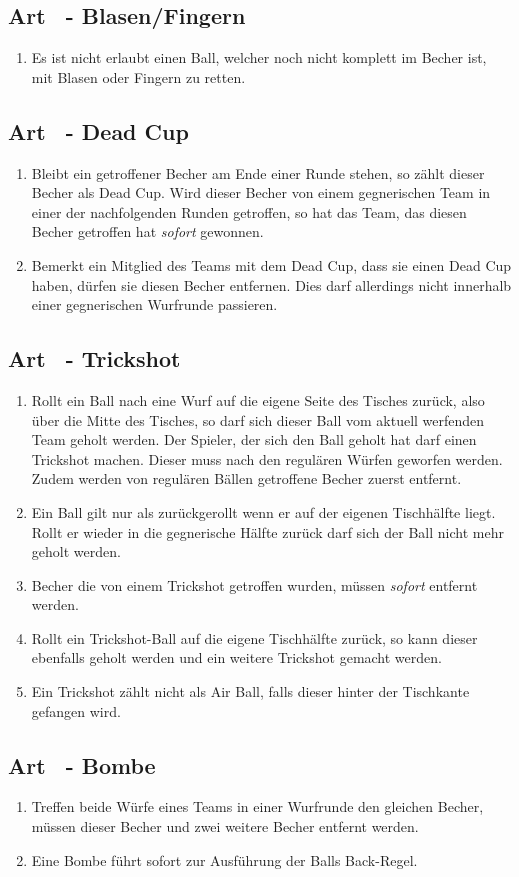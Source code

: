 \documentclass[a4paper,11pt]{scrartcl}
\newcommand{\enum}[1]{\begin{enumerate}[label=(\arabic*)]#1\end{enumerate}}
\newcommand{\art}[2]{\subsection*{#1} \enum{#2}}
\newcommand{\quot}[1]{\glqq #1\grqq}
\newcounter{art}
\begin{document}
\art{Art \theart\ - \quot{Blasen/Fingern}}{
    \item
        Es ist nicht erlaubt einen Ball, welcher noch nicht komplett im Becher ist, mit \quot{Blasen} oder \quot{Fingern} zu retten.
}

\art{Art \theart\ - \quot{Dead Cup}}{
    \item
        Bleibt ein getroffener Becher am Ende einer Runde stehen, so zählt dieser Becher als \quot{Dead Cup}. Wird dieser Becher von einem gegnerischen Team in einer der nachfolgenden Runden getroffen, so hat das Team, das diesen Becher getroffen hat \emph{sofort} gewonnen.
    \item
        Bemerkt ein Mitglied des Teams mit dem \quot{Dead Cup}, dass sie einen \quot{Dead Cup} haben, dürfen sie diesen Becher entfernen. Dies darf allerdings nicht innerhalb einer gegnerischen Wurfrunde passieren.
}

\art{Art \theart\ - \quot{Trickshot}}{
    \item
        Rollt ein Ball nach eine Wurf auf die eigene Seite des Tisches zurück, also über die Mitte des Tisches, so darf sich dieser Ball vom aktuell werfenden Team geholt werden. Der Spieler, der sich den Ball geholt hat darf einen \quot{Trickshot} machen. Dieser muss nach den regulären Würfen geworfen werden. Zudem werden von regulären Bällen getroffene Becher zuerst entfernt.
    \item
        Ein Ball gilt nur als zurückgerollt wenn er auf der eigenen Tischhälfte liegt. Rollt er wieder in die gegnerische Hälfte zurück darf sich der Ball nicht mehr geholt werden.
    \item
        Becher die von einem \quot{Trickshot} getroffen wurden, müssen \emph{sofort} entfernt werden.
    \item
        Rollt ein \quot{Trickshot}-Ball auf die eigene Tischhälfte zurück, so kann dieser ebenfalls geholt werden und ein weitere \quot{Trickshot} gemacht werden.
    \item
        Ein \quot{Trickshot} zählt nicht als \quot{Air Ball}, falls dieser hinter der Tischkante gefangen wird.
}

\art{Art \theart\ - \quot{Bombe}}{
    \item
        Treffen beide Würfe eines Teams in einer Wurfrunde den gleichen Becher, müssen dieser Becher und zwei weitere Becher entfernt werden.
    \item
        Eine \quot{Bombe} führt sofort zur Ausführung der \quot{Balls Back}-Regel.
}
\end{document}
